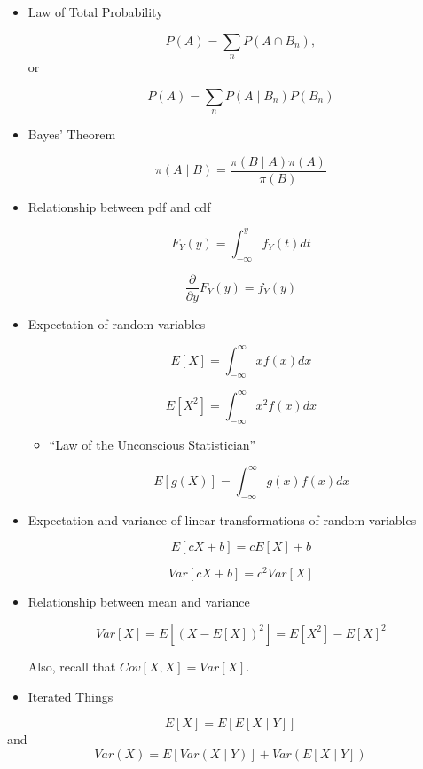 \documentclass[
  letterpaper,
  DIV=11,
  numbers=noendperiod]{scrreprt}
\begin{document}
\begin{itemize}
\item
  Law of Total Probability

  \[
  P(A) = \sum_n P(A \cap B_n),
  \]or

  \[
  P(A) = \sum_n P(A \mid B_n) P(B_n)
  \]
\item
  Bayes' Theorem

  \[
  \pi(A \mid B) = \frac{\pi(B \mid A) \pi(A)}{\pi(B)}
  \]
\item
  Relationship between pdf and cdf

  \[
  F_Y(y) = \int_{-\infty}^y f_Y(t)dt
  \]

  \[
  \frac{\partial}{\partial y}F_Y(y) = f_Y(y)
  \]
\item
  Expectation of random variables

  \[
  E[X] = \int_{-\infty}^\infty x f(x) dx
  \]

  \[
  E[X^2] = \int_{-\infty}^\infty x^2 f(x) dx
  \]

  \begin{itemize}
  \item
    ``Law of the Unconscious Statistician''

    \[
    E[g(X)] = \int_{-\infty}^\infty g(x)f(x)dx
    \]
  \end{itemize}
\item
  Expectation and variance of linear transformations of random variables

  \[
  E[cX + b] = c E[X] + b
  \]

  \[
  Var[cX + b] = c^2 Var[X]
  \]
\item
  Relationship between mean and variance

  \[
  Var[X] = E[(X - E[X])^2] = E[X^2] - E[X]^2
  \]

  Also, recall that \(Cov[X, X] = Var[X]\).
\item
  Iterated Things
\end{itemize}

\[
E[X] = E[E[X \mid Y]]
\] and \[
Var(X) = E[Var(X \mid Y)] + Var(E[X \mid Y])
\]
\end{document}

